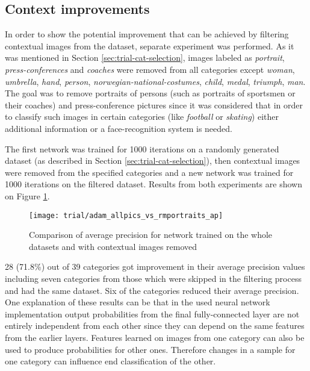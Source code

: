 \subsection{Context improvements}
    In order to show the potential improvement that can be achieved by filtering contextual images from the dataset, separate experiment was performed. As it was mentioned in Section \ref{sec:trial-cat-selection}, images labeled as \textit{portrait}, \textit{press-conferences} and \textit{coaches} were removed from all categories except \textit{woman}, \textit{umbrella}, \textit{hand}, \textit{person}, \textit{norwegian-national-costumes}, \textit{child}, \textit{medal}, \textit{triumph}, \textit{man}. The goal was to remove portraits of persons (such as portraits of sportsmen or their coaches) and press-conference pictures since it was considered that in order to classify such images in certain categories (like \textit{football} or \textit{skating}) either additional information or a face-recognition system is needed.
    
    The first network was trained for 1000 iterations on a randomly generated dataset (as described in Section \ref{sec:trial-cat-selection}), then contextual images were removed from the specified categories and a new network was trained for 1000 iterations on the filtered dataset. Results from both experiments are shown on Figure \ref{fig:trial-allpics-vs-rmportraits}.
    
    \begin{figure}[H]
        \centering
        \texttt{[image: trial/adam\_allpics\_vs\_rmportraits\_ap]}
        \caption[Trial experiment. Average precision for all images vs contextual removed]{Comparison of average precision for network trained on the whole datasets and with contextual images removed}
        \label{fig:trial-allpics-vs-rmportraits}
    \end{figure}
    
    28 (71.8\%) out of 39 categories got improvement in their average precision values including seven categories from those which were skipped in the filtering process and had the same dataset. Six of the categories reduced their average precision. One explanation of these results can be that in the used neural network implementation output probabilities from the final fully-connected layer are not entirely independent from each other since they can depend on the same features from the earlier layers. Features learned on images from one category can also be used to produce probabilities for other ones. Therefore changes in a sample for one category can influence end classification of the other.
    

